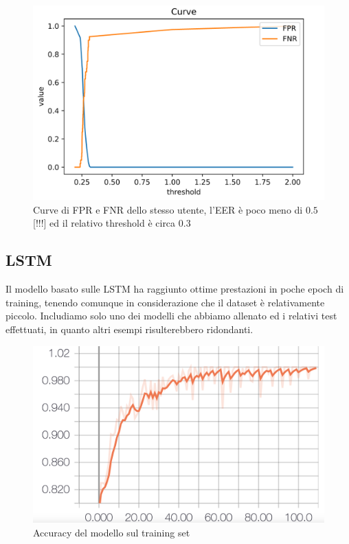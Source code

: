 \documentclass[8pt,notitlepage]{report}
\begin{document}
			\begin{figure}[H]
				\begin{center}
					\includegraphics[scale=.35]{fpr_fnr_FDTW_Dario}
					\caption{Curve di FPR e FNR dello stesso utente, l'EER è poco meno di $ 0.5 $[!!!] ed il relativo threshold è circa $ 0.3 $}
				\end{center}
			\end{figure}

		
		\subsection{LSTM}
		
			Il modello basato sulle LSTM ha raggiunto ottime prestazioni in poche epoch di training, tenendo comunque in considerazione che il dataset è relativamente piccolo. Includiamo solo uno dei modelli che abbiamo allenato ed i relativi test effettuati, in quanto altri esempi risulterebbero ridondanti. 
			\begin{figure}[H]
				\begin{center}
					\includegraphics[scale=.1865]{acc_Antonio}
					\caption{Accuracy del modello sul training set}
					\label{fig:acc_train}
				\end{center}
			\end{figure}
			
\end{document}
